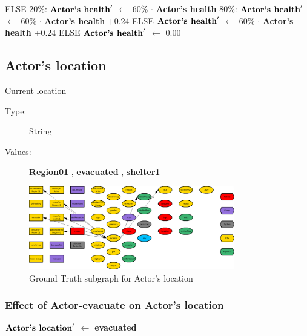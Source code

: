\documentclass{article}%
\begin{document}
\begin{flushleft}
\linebreak%
\hspace*{6em}%
ELSE %
\linebreak%
\hspace*{8em}%
20\%: %
$\mbox{\textbf{Actor's health}} '$%
$\leftarrow$%
60\%%
$\cdot$%
\textbf{Actor's health}%
\linebreak%
\hspace*{8em}%
80\%: %
$\mbox{\textbf{Actor's health}} '$%
$\leftarrow$%
60\%%
$\cdot$%
\textbf{Actor's health}%
+0.24%
\linebreak%
\hspace*{4em}%
ELSE %
$\mbox{\textbf{Actor's health}} '$%
$\leftarrow$%
60\%%
$\cdot$%
\textbf{Actor's health}%
+0.24%
\linebreak%
\hspace*{2em}%
ELSE %
$\mbox{\textbf{Actor's health}} '$%
$\leftarrow$%
0.00%
\end{flushleft}

%
\subsection{Actor's location}%
\label{subsec:Actor's location}%
Current location%
\begin{description}%
\item[Type:]%
String%
\item[Values:]%
\textbf{Region01}%
, %
\textbf{evacuated}%
, %
\textbf{shelter1}%
\end{description}%


\begin{figure}[ht]%
\centering%
\includegraphics[width=0.8\textwidth]{images/locationOfActor.png}%
\caption{Ground Truth subgraph for Actor's location}%
\end{figure}

%
\subsubsection{Effect of Actor{-}evacuate on Actor's location}%
\label{ssubsec:Effect of Actor{-}evacuate on Actor's location}%
\begin{flushleft}%
$\mbox{\textbf{Actor's location}} '$%
$\leftarrow$%
\textbf{evacuated}%
\end{flushleft}
\end{document}
